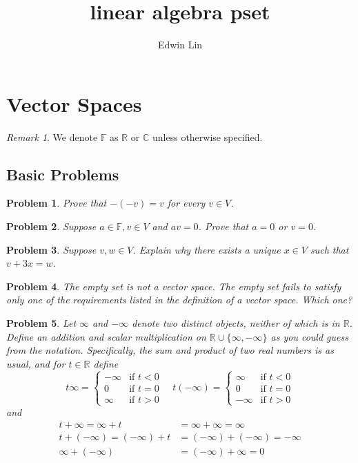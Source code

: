 \documentclass[12pt]{article}
\newcommand{\C}{\mathbb{C}}
\newcommand{\R}{\mathbb{R}}
\newcommand{\F}{\mathbb{F}}
\theoremstyle{problem}
\newtheorem{problem}{Problem}
\theoremstyle{remark}
\newtheorem{rmk}{Remark}
\begin{document}
\title{linear algebra pset}
\author{Edwin Lin}
\date{}
\maketitle
\newpage
\tableofcontents
\newpage

\section{Vector Spaces}
\begin{rmk}
We denote $\F$ as $\R$ or $\C$ unless otherwise specified.
\end{rmk}
\subsection{Basic Problems}
\begin{problem}
Prove that $-(-v) =v $ for every $v \in V$. 
\end{problem}
\begin{problem}
    Suppose $a \in \F, v \in V$ and $av = 0$. Prove that $a = 0$ or $v = 0$.
\end{problem}
\begin{problem}
    Suppose $v,w \in V$. Explain why there exists a unique $x \in V$ such that $v +3x = w$.
\end{problem}
\begin{problem}
    The empty set is not a vector space. The empty set fails to satisfy only one of the requirements listed in the definition of a vector space. Which one? 
\end{problem}

\begin{problem}
    Let $\infty$ and $-\infty$ denote two distinct objects, neither of which is in $\R$. Define an addition and scalar multiplication on $\R \cup\{\infty,-\infty\}$ as you could guess from the notation. Specifically, the sum and product of two real numbers is as usual, and for $t \in \R$ define \\ 
\begin{equation*}
t\infty = \begin{cases}
             -\infty  & \text{if } t < 0 \\
             0  & \text{if } t =  0 \\
             \infty & \text{if } t > 0
       \end{cases} \quad
t(-\infty) = \begin{cases}
             \infty  & \text{if } t < 0 \\
             0  & \text{if } t = 0 \\
             -\infty &\text{if } t >0
       \end{cases}
\end{equation*}
and
\begin{align*}
    t + \infty = \infty + t &= \infty + \infty = \infty \\
    t+ (-\infty) = (-\infty) + t &= (-\infty) + (-\infty) = -\infty \\
    \infty + (-\infty) &= (-\infty) + \infty = 0
\end{align*}
\end{problem}
\end{document}
